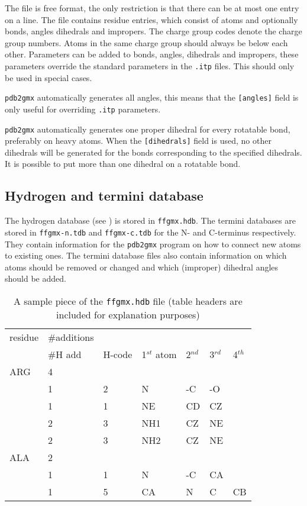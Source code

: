 The file is free format, the only restriction is that there can be at most
one entry on a line. 
The file contains residue entries, which consist of atoms and optionally 
bonds, angles dihedrals and impropers.
The charge group codes denote the charge group numbers.
Atoms in the same charge group should always be below each other.
Parameters can be added to bonds, angles, dihedrals and impropers,
these parameters override the standard parameters in the {\tt .itp} files.
This should only be used in special cases. 

{\tt pdb2gmx} automatically generates all angles, this means that the
{\tt [angles]} field is only useful for overriding {\tt .itp} parameters. 

{\tt pdb2gmx} automatically generates one proper dihedral for every rotatable
bond, preferably on heavy atoms. When the {\tt [dihedrals]} field is used,
no other dihedrals will be generated for the bonds corresponding to the
specified  dihedrals. It is possible to put more than one dihedral on a
rotatable bond. 

\subsection{Hydrogen and termini database}
The hydrogen database (see ) is stored in {\tt ffgmx.hdb}. The termini
databases are stored in {\tt ffgmx-n.tdb} and {\tt ffgmx-c.tdb} for the
N- and C-terminus respectively. They contain information for the {\tt pdb2gmx}
program on how to connect new atoms to existing ones. The termini
database files also contain information on which atoms should be
removed or changed and which (improper) dihedral angles should be
added.

\begin{table}[h]
\caption{A sample piece of the {\tt ffgmx.hdb} file 
(table headers are included for explanation purposes)}
\label{tab:ffgmxhdb}
\centering
\begin{tabular}{lllllll}
residue & \#additions&  &       &       &  	&	\\
        & \#H add    & H-code& 1$^{st}$ atom    & 2$^{nd}$ & 3$^{rd}$ & 4$^{th}$ \\
\hline
ARG     & 4	&	&  	&	&	&	\\
        & 1	& 2     & N     & -C	& -O	&     	\\
        & 1	& 1     & NE    & CD	& CZ	&    	\\
        & 2	& 3     & NH1   & CZ	& NE	&   	\\
        & 2	& 3     & NH2   & CZ	& NE	& 	\\
ALA 	& 2	& 	&	&	&	&	\\
	& 1	& 1	& N	& -C	& CA	&	\\
	& 1	& 5	& CA	& N	& C	& CB
\end{tabular}
\end{table}

